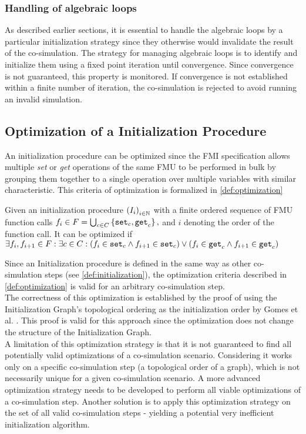 \subsubsection{Handling of algebraic loops}
As described earlier sections, it is essential to handle the algebraic loops by a particular initialization strategy since they otherwise would invalidate the result of the co-simulation. The strategy for managing algebraic loops is to identify and initialize them using a fixed point iteration until convergence. Since convergence is not guaranteed, this property is monitored. If convergence is not established within a finite number of iteration, the co-simulation is rejected to avoid running an invalid simulation.

\subsection{Optimization of a Initialization Procedure}
An initialization procedure can be optimized since the FMI specification allows multiple \textit{set} or \textit{get} operations of the same FMU to be performed in bulk by grouping them together to a single operation over multiple variables with similar characteristic. This criteria of optimization is formalized in \cref{def:optimization}
\begin{definition}\label{def:optimization}
  Given an initialization procedure $ \left( I_i \right)_{i \in \mathbb{N}}$ with a finite ordered sequence of FMU function calls $f_i \in F = \bigcup_{c \in C}  \left\{ \mathtt{set}_{c},\mathtt{get}_{c} \right\},$ and $i$ denoting the order of the function call. It can be optimized if $\exists f_i, f_{i +1} \in F : \exists c \in C :(f_i \in {\mathtt{set}_{c}} \land f_{i+1} \in {\mathtt{set}_{c}}) \lor (f_i \in {\mathtt{get}_{c}} \land f_{i+1} \in {\mathtt{get}_{c}})$
\end{definition}
Since an Initialization procedure is defined in the same way as other co-simulation steps (see \cref{def:initialization}), the optimization criteria described in \cref{def:optimization} is valid for an arbitrary co-simulation step. \\
The correctness of this optimization is established by the proof of using the Initialization Graph's topological ordering as the initialization order by Gomes et al. \cite{Gomes2019}. This proof is valid for this approach since the optimization does not change the structure of the Initialization Graph. \\
A limitation of this optimization strategy is that it is not guaranteed to find all potentially valid optimizations of a co-simulation scenario. Considering it works only on a specific co-simulation step (a topological order of a graph), which is not necessarily unique for a given co-simulation scenario. A more advanced optimization strategy needs to be developed to perform all viable optimizations of a co-simulation step. Another solution is to apply this optimization strategy on the set of all valid co-simulation steps - yielding a potential very inefficient initialization algorithm.

